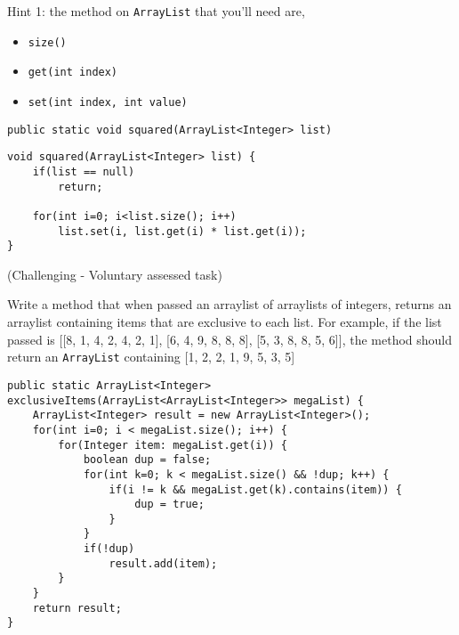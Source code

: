 \begin{questions}
Hint 1: the method on \texttt{ArrayList} that you'll need are,

\begin{itemize}
\item \texttt{size()}
\item\texttt{get(int index)}
\item \texttt{set(int index, int value)}
\end{itemize}

\begin{lstlisting}
public static void squared(ArrayList<Integer> list)
\end{lstlisting}

\begin{solution}
\begin{lstlisting}
void squared(ArrayList<Integer> list) {
	if(list == null)
		return;

	for(int i=0; i<list.size(); i++)
		list.set(i, list.get(i) * list.get(i));
}
\end{lstlisting}
\end{solution}

\question (Challenging - Voluntary assessed task)

Write a method that when passed an arraylist of arraylists of integers, returns an arraylist containing items that are exclusive to each list. For example, if the list passed is [[8, 1, 4, 2, 4, 2, 1], [6, 4, 9, 8, 8, 8], [5, 3, 8, 8, 5, 6]], the method should return an \texttt{ArrayList} containing [1, 2, 2, 1, 9, 5, 3, 5]

\begin{solution}
\begin{lstlisting}
public static ArrayList<Integer> exclusiveItems(ArrayList<ArrayList<Integer>> megaList) {
	ArrayList<Integer> result = new ArrayList<Integer>();
	for(int i=0; i < megaList.size(); i++) {
		for(Integer item: megaList.get(i)) {
			boolean dup = false;
			for(int k=0; k < megaList.size() && !dup; k++) {
				if(i != k && megaList.get(k).contains(item)) {
					dup = true;
				}	
			}
			if(!dup) 
				result.add(item);
		}
	}
	return result;
}
\end{lstlisting}
\end{solution}
\end{questions}
	

